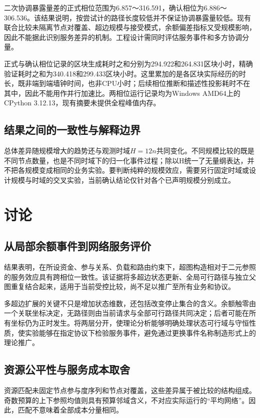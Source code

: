 \documentclass[UTF8,a4paper,twocolumn,fontset=none,zihao=5]{ctexart}
\begin{document}
二次协调暴露量差的正式相位范围为6.857～316.591，确认相位为6.886～306.536。该结果说明，按尝试计的路径长度较低并不保证协调暴露量较低。现有联合比较未隔离节点对覆盖、超边规模与接受模式，余额偏差指标又受规模影响，因此不能据此识别服务差异的机制。工程设计需同时评估服务事件和多方协调分量。


正式与确认相位记录的区块生成耗时之和分别为294.922和264.831区块小时，精确验证耗时之和为340.418和299.433区块小时。这里累加的是各区块实际经历的时长，既非端到端墙钟时间，也非CPU小时；后续相位推断和描述性投影耗时不在其中，因此不能用作并行加速比。两相位运行记录均为Windows AMD64上的CPython 3.12.13，现有摘要未提供全程峰值内存。


\subsection{结果之间的一致性与解释边界}

总体差异随规模增大的趋势还与观测时域$H=12n$共同变化。不同规模比较的既是不同节点数量，也是不同时域下的归一化事件过程；除以H统一了无量纲表达，并不把各规模变成相同的业务实验。要判断纯粹的规模效应，需要另行固定时域或设计规模与时域的交叉实验，当前确认结论仅针对各个已声明规模分别成立。


\section{讨论}

\subsection{从局部余额事件到网络服务评价}

结果表明，在所设资金、参与关系、负载和路由约束下，超图构造相对于二元参照的服务效应具有跨相位一致性。该证据将多超边状态更新、全局可行路径与独立父图重复结合起来，适用于当前受控比较，尚不足以推广至所有业务和协议。


多超边扩展的关键不只是增加状态维数，还包括改变停止集合的含义。余额触零由一个关联坐标决定，无路径则由当前请求与全部可行路径共同决定；后者可能在所有坐标仍为正时发生。将两层分开，使理论分析能够明确处理状态可行域与守恒性质，使实验能够在指定协议下检验服务事件，避免通过更换事件名称制造形式上的理论推广。


\subsection{资源公平性与服务成本取舍}

资源匹配未固定节点参与度序列和节点对覆盖，这些差异属于被比较的结构组成。奇数预算的上下参照均值则具有预算邻域含义，不对应实际运行的“平均网络”。因此，匹配不意味着全部成本分量相同。
\end{document}
